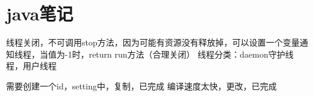 \documentclass[utf8]{ctexart}
\begin{document}
    \section{java笔记}
    线程关闭，不可调用stop方法，因为可能有资源没有释放掉，可以设置一个变量通知线程，当值为-1时，return run方法（合理关闭）
    线程分类：daemon守护线程，用户线程 


    需要创建一个id，setting中，复制，已完成
    编译速度太快，更改，已完成
\end{document}
